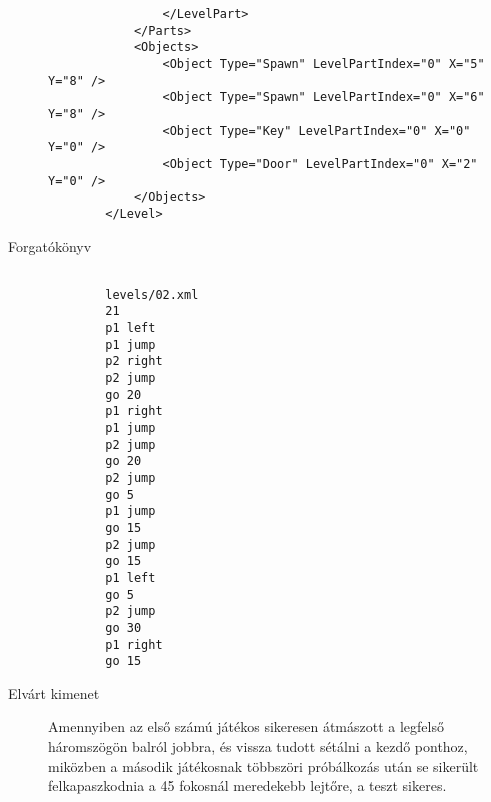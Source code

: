 \begin{description}
\begin{verbatim}
		        </LevelPart>
		    </Parts>
		    <Objects>
		        <Object Type="Spawn" LevelPartIndex="0" X="5" Y="8" />
		        <Object Type="Spawn" LevelPartIndex="0" X="6" Y="8" />
		        <Object Type="Key" LevelPartIndex="0" X="0" Y="0" />
		        <Object Type="Door" LevelPartIndex="0" X="2" Y="0" />
		    </Objects>
		</Level>
	\end{verbatim}
	
	\item[Forgatókönyv]
	\begin{verbatim}

		levels/02.xml
		21
		p1 left
		p1 jump
		p2 right
		p2 jump
		go 20
		p1 right
		p1 jump
		p2 jump
		go 20
		p2 jump
		go 5
		p1 jump
		go 15
		p2 jump
		go 15
		p1 left
		go 5
		p2 jump
		go 30
		p1 right
		go 15
	\end{verbatim}
	
	\item[Elvárt kimenet] Amennyiben az első számú játékos sikeresen átmászott a legfelső háromszögön balról jobbra, és vissza tudott sétálni a kezdő ponthoz, miközben a második játékosnak többszöri próbálkozás után se sikerült felkapaszkodnia a 45 fokosnál meredekebb lejtőre, a teszt sikeres.
	
\end{description}

\newpage

